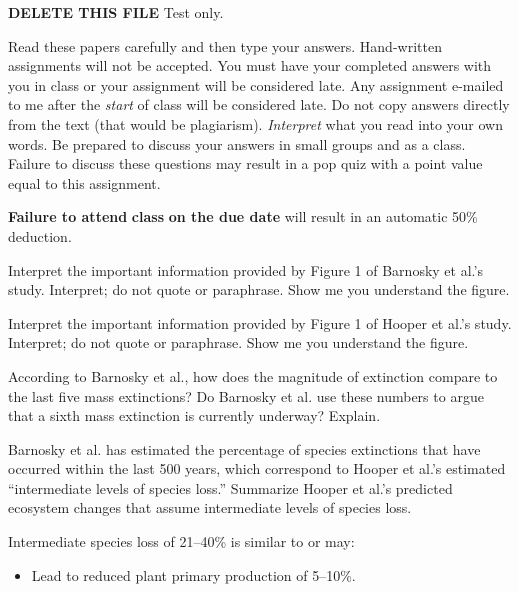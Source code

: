 \documentclass[11pt, addpoints]{exam}
\begin{document}
\textbf{DELETE THIS FILE} Test only.

Read these papers carefully and then type your answers. Hand-written
assignments will not be accepted. You must have your completed answers
with you in class or your assignment will be considered late. Any
assignment e-mailed to me after the \emph{start} of class will be
considered late. Do not copy answers directly from the text (that would
be plagiarism). \emph{Interpret} what you read into your own words. Be
prepared to discuss your answers in small groups and as a class. Failure
to discuss these questions may result in a pop quiz with a point value
equal to this assignment.

\textbf{Failure to attend} \textbf{class} \textbf{on the due date} will
result in an automatic 50\% deduction.

\begin{questions}

\question[5]
 Interpret the important information provided by Figure 1 of Barnosky et 
  al.'s study. Interpret; do not quote or paraphrase. Show me you
  understand the figure.

\question[5]
Interpret the important information provided by Figure 1 of Hooper et
  al.'s study. Interpret; do not quote or paraphrase. Show me you
  understand the figure.
  

\question[5]
According to Barnosky et al., how does the magnitude of extinction compare to the last five mass extinctions? Do
  Barnosky et al. use these numbers to argue that a sixth mass
  extinction is currently underway? Explain.


\question[10]
Barnosky et al. has estimated the percentage of species extinctions
  that have occurred within the last 500 years, which correspond to
  Hooper et al.'s estimated ``intermediate levels of species loss.''
  Summarize Hooper et al.'s predicted ecosystem changes that assume
  intermediate levels of species loss.

\ifprintanswers\begin{solution}
Intermediate species loss of 21--40\% is similar to or may:

\begin{itemize}
	\item Lead to reduced plant primary production of 5--10\%.


\end{itemize}
\end{solution}
\end{questions}
\end{document}
